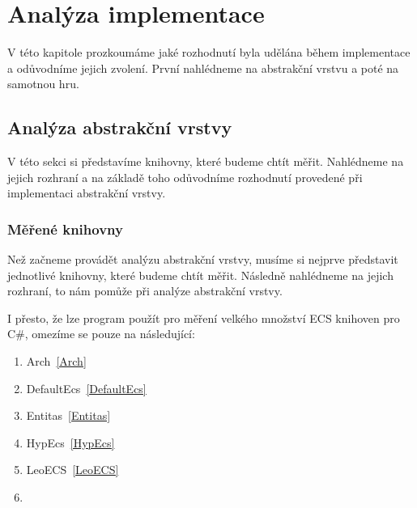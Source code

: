 \chapter{Analýza implementace}
V této kapitole prozkoumáme jaké rozhodnutí byla udělána během implementace a odůvodníme jejich zvolení. První nahlédneme na abstrakční vrstvu a poté na samotnou hru.

\section{Analýza abstrakční vrstvy}
V této sekci si představíme knihovny, které budeme chtít měřit. Nahlédneme na jejich rozhraní a na základě toho odůvodníme rozhodnutí provedené při implementaci abstrakční vrstvy.

\subsection{Měřené knihovny}
Než začneme provádět analýzu abstrakční vrstvy, musíme si nejprve představit jednotlivé knihovny, které budeme chtít měřit. Následně nahlédneme na jejich rozhraní, to nám pomůže při analýze abstrakční vrstvy.

I přesto, že lze program použít pro měření velkého množství ECS knihoven pro C\#, omezíme se pouze na následující:

\begin{enumerate}
    \item Arch~\ref{Arch}
    \item DefaultEcs~\ref{DefaultEcs}
    \item Entitas~\ref{Entitas}
    \item HypEcs~\ref{HypEcs}
    \item LeoECS~\ref{LeoECS}
    \item {}
\end{enumerate}

\\\\


\\\\
\\\\
\\\\
\\\\
\\\\

